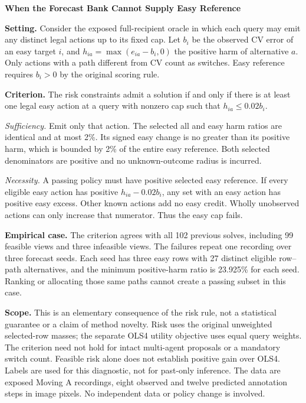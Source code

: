 \documentclass[10pt,letterpaper]{article}
\begin{document}
{\Large\bfseries When the Forecast Bank Cannot Supply Easy Reference}

\textbf{Setting.} Consider the exposed full-recipient oracle in
which each query may emit any distinct legal actions up to its fixed
cap. Let $b_i$ be the observed CV error of an easy target $i$, and
$h_{ia}=\max(e_{ia}-b_i,0)$ the positive harm of alternative $a$.
Only actions with a path different from CV count as switches.
Easy reference requires $b_i>0$ by the original scoring rule.

\textbf{Criterion.} The risk constraints admit a solution if and
only if there is at least one legal easy action at a query with
nonzero cap such that $h_{ia}\leq 0.02b_i$.

\textit{Sufficiency.} Emit only that action. The selected all and
easy harm ratios are identical and at most 2\%. Its signed easy
change is no greater than its positive harm, which is bounded by
2\% of the entire easy reference. Both selected denominators are
positive and no unknown-outcome radius is incurred.

\textit{Necessity.} A passing policy must have positive selected
easy reference. If every eligible easy action has positive
$h_{ia}-0.02 b_i$, any set with an easy action has positive easy
excess. Other known actions add no easy credit. Wholly unobserved
actions can only increase that numerator. Thus the easy cap fails.

\textbf{Empirical case.} The criterion agrees with all 102 previous
solves, including 99 feasible views and three infeasible views.
The failures repeat one recording over three forecast seeds.
Each seed has three easy rows with 27 distinct eligible row--path
alternatives, and the minimum positive-harm ratio is 23.925\%
for each seed. Ranking or allocating those same paths cannot create
a passing subset in this case.

\textbf{Scope.} This is an elementary consequence of the risk rule,
not a statistical guarantee or a claim of method novelty. Risk uses
the original unweighted selected-row masses; the separate OLS4
utility objective uses equal query weights. The criterion need not
hold for intact multi-agent proposals or a mandatory switch count.
Feasible risk alone does not establish positive gain over OLS4.
Labels are used for this diagnostic, not for past-only inference.
The data are exposed Moving A recordings, eight observed and
twelve predicted annotation steps in image pixels. No independent
data or policy change is involved.
\end{document}
